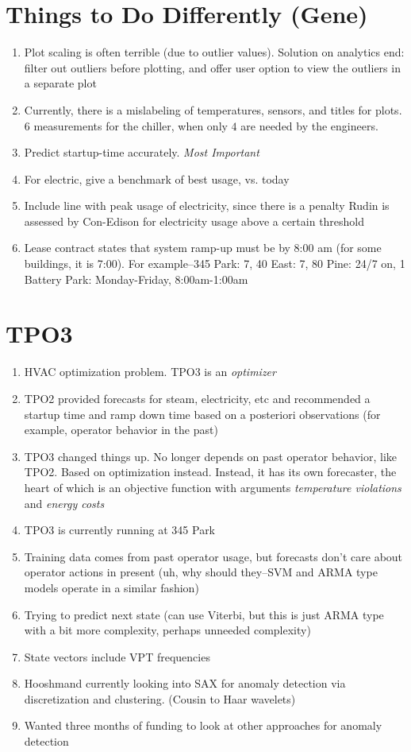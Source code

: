 \documentclass[12pt,a4paper]{article}
\begin{document}
\section{Things to Do Differently (Gene)}
\begin{enumerate}
	\item Plot scaling is often terrible (due to outlier values). Solution on 
	analytics end: filter out outliers before plotting, and offer user option 
	to view the outliers in a separate plot
	\item Currently, there is a mislabeling of temperatures, sensors, and 
	titles for plots. $6$ measurements for the chiller, when only $4$ are 
	needed by the engineers.
	\item Predict startup-time accurately. \emph{Most Important}
	\item For electric, give a benchmark of best usage, vs. today
	\item Include line with peak usage of electricity, since there is a penalty 
	Rudin is assessed by Con-Edison for electricity usage above a certain 
	threshold
	\item Lease contract states that system ramp-up must be by 8:00 am (for 
	some buildings, it is 7:00). For example--345 Park: 7, 40 East: 7, 80 Pine: 
	24/7 on, 1 Battery Park: Monday-Friday, 8:00am-1:00am
\end{enumerate}
\section{TPO3}
\begin{enumerate}
	\item HVAC optimization problem. TPO3 is an \emph{optimizer}
	\item TPO2 provided forecasts for steam, electricity, etc and recommended
	a startup time and ramp down time based on a posteriori observations (for 
	example, operator behavior in the past)
	\item TPO3 changed things up. No longer depends on past operator behavior, 
	like TPO2. Based on optimization instead. Instead, it has its own 
	forecaster, the heart of which is an objective function with arguments 
	\emph{temperature violations} and \emph{energy costs}
	\item TPO3 is currently running at 345 Park
	\item Training data comes from past operator usage, but forecasts don't 
	care about operator actions in present (uh, why should they--SVM and ARMA 
	type models operate in a similar fashion)
	\item Trying to predict next state (can use Viterbi, but this is just ARMA 
	type with a bit more complexity, perhaps unneeded complexity)
	\item State vectors include VPT frequencies
	\item Hooshmand currently looking into SAX for anomaly detection via 
	discretization and clustering. (Cousin to Haar wavelets)
	\item Wanted three months of funding to look at other approaches for 
	anomaly detection
\end{enumerate}
\end{document}
